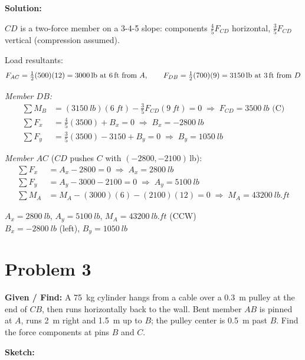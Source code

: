 \documentclass[11pt]{article}
\newcommand{\problemhead}[2]{%
    \clearpage
    \section*{Problem #1}
    \textbf{Given / Find:} #2
}
\begin{document}
\textbf{Solution:}

$CD$ is a two-force member on a 3-4-5 slope: components $\tfrac45F_{CD}$ horizontal, $\tfrac35F_{CD}$ vertical (compression assumed).

Load resultants:
\[
F_{AC} = \tfrac12(500)(12) = \SI{3000}{lb} \text{ at \SI{6}{ft} from } A, \qquad
F_{DB} = \tfrac12(700)(9) = \SI{3150}{lb} \text{ at \SI{3}{ft} from } D
\]

\textit{Member $DB$:}
\begin{align*}
\textstyle\sum M_B &= (\SI{3150}{lb})(\SI{6}{ft}) - \tfrac35F_{CD}(\SI{9}{ft}) = 0 \;\Rightarrow\; F_{CD} = \SI{3500}{lb}\text{ (C)}\\
\textstyle\sum F_x &= \tfrac45(3500) + B_x = 0 \;\Rightarrow\; B_x = \SI{-2800}{lb}\\
\textstyle\sum F_y &= \tfrac35(3500) - 3150 + B_y = 0 \;\Rightarrow\; B_y = \SI{1050}{lb}
\end{align*}

\textit{Member $AC$} ($CD$ pushes $C$ with $(-2800, -2100)$\,lb):
\begin{align*}
\textstyle\sum F_x &= A_x - 2800 = 0 \;\Rightarrow\; A_x = \SI{2800}{lb}\\
\textstyle\sum F_y &= A_y - 3000 - 2100 = 0 \;\Rightarrow\; A_y = \SI{5100}{lb}\\
\textstyle\sum M_A &= M_A - (3000)(6) - (2100)(12) = 0 \;\Rightarrow\; M_A = \SI{43200}{lb.ft}
\end{align*}

\begin{finalanswer}
$A_x = \SI{2800}{lb}$, \quad $A_y = \SI{5100}{lb}$, \quad $M_A = \SI{43200}{lb.ft}$ (CCW)\\[2pt]
$B_x = \SI{-2800}{lb}$ (left), \quad $B_y = \SI{1050}{lb}$
\end{finalanswer}

\problemhead{3}{A \SI{75}{kg} cylinder hangs from a cable over a \SI{0.3}{m} pulley at the end of $CB$, then runs horizontally back to the wall. Bent member $AB$ is pinned at $A$, runs \SI{2}{m} right and \SI{1.5}{m} up to $B$; the pulley center is \SI{0.5}{m} past $B$. Find the force components at pins $B$ and $C$.}

\textbf{Sketch:}
\end{document}

